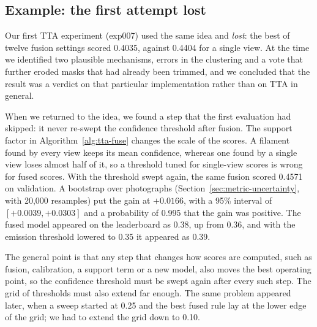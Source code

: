 \subsection{Example: the first attempt lost}\label{sec:tta-first}
Our first TTA experiment (exp007) used the same idea and \emph{lost}: the best of twelve fusion
settings scored 0.4035, against 0.4404 for a single view. At the time we identified two plausible
mechanisms, errors in the clustering and a vote that further eroded masks that had already been
trimmed, and we concluded that the result was a verdict on that particular implementation rather
than on TTA in general.

When we returned to the idea, we found a step that the first evaluation had skipped: it never
re-swept the confidence threshold after fusion. The support factor in Algorithm~\ref{alg:tta-fuse}
changes the scale of the scores. A filament found by every view keeps its mean confidence, whereas
one found by a single view loses almost half of it, so a threshold tuned for single-view scores is
wrong for fused scores. With the threshold swept again, the same fusion scored 0.4571 on validation.
A bootstrap over photographs (Section~\ref{sec:metric-uncertainty}, with 20,000 resamples) put the
gain at $+0.0166$, with a 95\% interval of $[+0.0039, +0.0303]$ and a probability of 0.995 that the
gain was positive. The fused model appeared on the leaderboard as 0.38, up from 0.36, and with the
emission threshold lowered to 0.35 it appeared as 0.39.

The general point is that any step that changes how scores are computed, such as fusion,
calibration, a support term or a new model, also moves the best operating point, so the confidence
threshold must be swept again after every such step. The grid of thresholds must also extend far
enough. The same problem appeared later, when a sweep started at 0.25 and the best fused rule lay at
the lower edge of the grid; we had to extend the grid down to 0.10.

